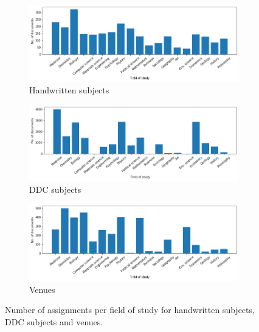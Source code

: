 \begin{figure}
  \begin{subfigure}[t]{\textwidth}
    \centering
    \includegraphics[width=\textwidth]{figures/evaluation/eval_hw_fields.png}
    \caption{Handwritten subjects}
    \label{fig:eval_hw_fields}
  \end{subfigure}
  \hfill
  \begin{subfigure}[t]{\textwidth}
    \centering
    \includegraphics[width=\textwidth]{figures/evaluation/eval_ddc_fields.png}
    \caption{DDC subjects}
    \label{fig:eval_ddc_fields}
  \end{subfigure}
  \begin{subfigure}[t]{\textwidth}
    \centering
    \includegraphics[width=\textwidth]{figures/evaluation/eval_venue_fields.png}
    \caption{Venues}
    \label{fig:eval_venue_fields}
  \end{subfigure}
  \caption{Number of assignments per field of study for handwritten subjects, DDC subjects and venues.}
\end{figure}

